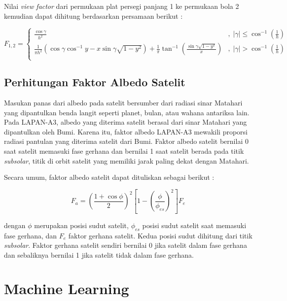 Nilai \textit{view factor} dari permukaan plat persegi panjang 1 ke permukaan
bola 2 kemudian dapat dihitung berdasarkan persamaan berikut \cite{martinez2022a}:

\begin{equation}
	F_{1,2} = 
\begin{cases} 
	\frac{\cos{\gamma}}{h^2} & ,\;|\gamma| \leq \cos^{-1}\left(\frac{1}{h}\right) \\
	\frac{1}{\pi h^2} \left( \cos{\gamma}\cos^{-1}y - x\sin{\gamma}\sqrt{1-y^2} \right) + \frac{1}{\pi}\tan^{-1}\left( \frac{\sin{\gamma}\sqrt{1-y^2}}{x} \right) & ,\;|\gamma| > \cos^{-1}\left(\frac{1}{h}\right) \\
\end{cases}
\label{eq:vf}
\end{equation}

\subsection{Perhitungan Faktor Albedo Satelit}

Masukan panas dari albedo pada satelit bersumber dari radiasi sinar Matahari
yang dipantulkan benda langit seperti planet, bulan, atau wahana antariksa
lain. Pada LAPAN-A3, albedo yang diterima satelit berasal dari sinar Matahari
yang dipantulkan oleh Bumi. Karena itu, faktor albedo LAPAN-A3 mewakili
proporsi radiasi pantulan yang diterima satelit dari Bumi. Faktor albedo
satelit bernilai 0 saat satelit memasuki fase gerhana dan bernilai 1 saat
satelit berada pada titik \textit{subsolar}, titik di orbit satelit yang
memiliki jarak paling dekat dengan Matahari. 

Secara umum, faktor albedo satelit dapat dituliskan sebagai berikut :

\begin{equation}
\label{eq:albedofactor}
F_a = \left( \frac{1 + \cos{\phi}}{2} \right)^2 \left[ 1 - \left( \frac{\phi}{\phi_{es}} \right)^2 \right] F_e
\end{equation}

dengan $\phi$ merupakan posisi sudut satelit, $\phi_{es}$ posisi sudut satelit
saat memasuki fase gerhana, dan $F_e$ faktor gerhana satelit. Kedua posisi
sudut dihitung dari titik \textit{subsolar}. Faktor gerhana satelit sendiri
bernilai 0 jika satelit dalam fase gerhana dan sebaliknya bernilai 1 jika
satelit tidak dalam fase gerhana.

\section{Machine Learning}

